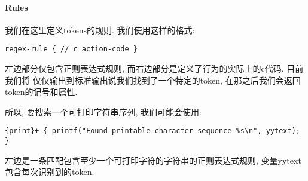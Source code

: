 
\paragraph{Rules}
我们在这里定义tokens的规则.
我们使用这样的格式: \\
\begin{lstlisting}
regex-rule { // c action-code }
\end{lstlisting}
左边部分仅包含正则表达式规则, 而右边部分是定义了行为的实际上的c代码. 目前我们将
仅仅输出到标准输出说我们找到了一个特定的token, 在那之后我们会返回token的记号和属性.

所以, 要搜索一个可打印字符串序列, 我们可能会使用: \\
\begin{lstlisting}
{print}+ { printf("Found printable character sequence %s\n", yytext); }
\end{lstlisting}
左边是一条匹配包含至少一个可打印字符的字符串的正则表达式规则, 变量yytext
包含每次识别到的token.

